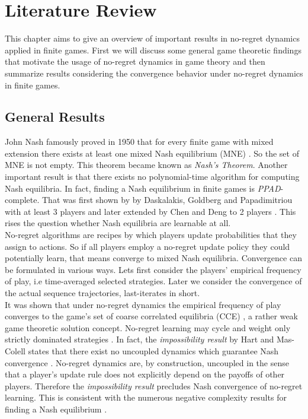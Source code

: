 
\chapter{Literature Review}\label{chapter:literatureReview}

This chapter aims to give an overview of important results in no-regret dynamics applied in finite games. First we will discuss some general game theoretic findings that motivate the usage of no-regret dynamics in game theory and then summarize results considering the convergence behavior under no-regret dynamics in finite games. \\

\section{General Results}\label{section:generalResults}

John Nash famously proved in 1950 that for every finite game with mixed extension there exists at least one mixed Nash equilibrium (MNE) \cite{nash}. So the set of MNE is not empty. This theorem became known as \textit{Nash's Theorem}. Another important result is that there exists no polynomial-time algorithm for computing Nash equilibria. In fact,  finding a Nash equilibrium in finite games is \textit{PPAD}-complete. That was first shown by by Daskalakis, Goldberg and Papadimitriou  with at least 3 players \cite{daskalakis} and later extended by Chen and Deng to 2 players \cite{chen}. This rises the question whether Nash equilibria are learnable at all. \\

No-regret algorithms are recipes by which players update probabilities that they assign to actions. So if all players employ a no-regret update policy they could potentially learn, that means converge to mixed Nash equilibria.  Convergence can be formulated in various ways. Lets first consider the players' empirical frequency of play, i.e time-averaged selected strategies. Later we consider the convergence of the actual sequence trajectories, last-iterates in short.\\

It was shown that under no-regret dynamics the empirical frequency of play converges to the game's set of coarse correlated equilibria (CCE) \cite{flokas}, a rather weak game theoretic solution concept. No-regret learning may cycle and weight only strictly dominated strategies \cite{mertikopoulos}. In fact, the \textit{impossibility result} by Hart and Mas-Colell states that there exist no uncoupled dynamics which guarantee Nash convergence \cite{hart}. No-regret dynamics are, by construction, uncoupled in the sense that a player’s update rule does not explicitly depend on the payoffs of other players. Therefore the \textit{impossibility result} precludes Nash convergence of no-regret learning. This is consistent with the numerous negative complexity results for finding a Nash equilibrium \cite{chen, daskalakis}. \\


